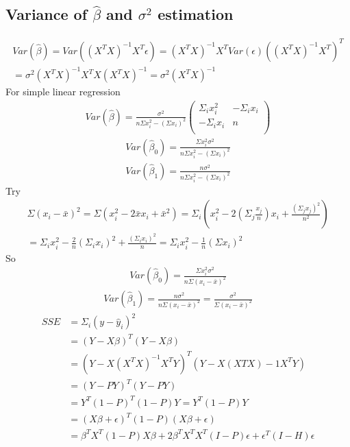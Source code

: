 \documentclass[a4paper]{article}
\begin{document}
\subsection{Variance of $\hat \beta$ and $\sigma^2$ estimation}
\begin{align*}
Var(\hat \beta)
=Var((X^TX)^{-1}X^T \epsilon)
=(X^TX)^{-1}X^T Var( \epsilon) ((X^TX)^{-1}X^T)^T\\
=\sigma^2 (X^TX)^{-1}X^T  X (X^TX)^{-1}
=\sigma^2 (X^TX)^{-1}
\end{align*}
For simple linear regression
\begin{align*}
Var(\hat \beta)
=\frac{\sigma^2}{n\Sigma x_i^2 - (\Sigma x_i)^2} \left(  \begin{array} {cc}
	          \Sigma_i x_i^2 & -\Sigma_i x_i \\
		 -\Sigma_i x_i &n\\
		\end{array}
		\right) 
\end{align*}
\begin{align*}
Var(\hat \beta_0) =\frac{\Sigma x_i^2 \sigma^2}{n\Sigma x_i^2 - (\Sigma x_i)^2} 
\end{align*}
\begin{align*}
Var(\hat \beta_1) =\frac{n \sigma^2}{n\Sigma x_i^2 - (\Sigma x_i)^2} 
\end{align*}
Try
\begin{align*}
\Sigma (x_i- \bar x)^2 = \Sigma(x_i^2 - 2 \bar x x_i+ \bar x^2)
= \Sigma_i(x_i^2 - 2 (\Sigma_j \frac{x_j}{n}) x_i + \frac{ (\Sigma_j x_j)^2} {n^2})\\
=\Sigma_ix_i^2 - \frac{2}{n} (\Sigma_i x_i)^2 + \frac{ (\Sigma_i x_i)^2} {n}
= \Sigma_i x^2_i - \frac{1}{n} (\Sigma x_i)^2
\end{align*}
So
\begin{align*}
Var(\hat \beta_0) =\frac{\Sigma x_i^2 \sigma^2}{n\Sigma (x_i- \bar x)^2 } 
\end{align*}
\begin{align*}
Var(\hat \beta_1) =\frac{n \sigma^2}{n\Sigma (x_i- \bar x)^2} = \frac{\sigma^2}{\Sigma (x_i- \bar x)^2}
\end{align*}
\begin{align*}
SSE
&=\Sigma_i (y-\hat y_i)^2 \\
& = (Y-X\beta)^T(Y-X\beta) \\
& = (Y-X(X^TX)^{-1}X^TY)^T(Y-X(XTX)-1X^TY) \\
& = (Y-PY)^T(Y-PY) \\
& = Y^T(1-P)^T(1-P)Y = Y^T(1-P)Y \\
& = (X\beta + \epsilon) ^T (1-P)(X\beta+\epsilon) \\
& = \beta^T X^T (1-P)X\beta + 2\beta^T X^T X^T(I-P)\epsilon 
   + \epsilon^T(I-H)\epsilon 
\end{align*}
\end{document}
